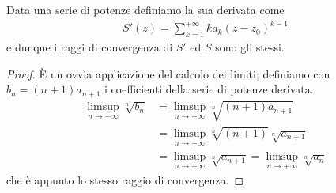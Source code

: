 \begin{theorem}
	\label{prop:invarianza-raggio-convergenza-derivata}
	Data una serie di potenze definiamo la sua derivata come 
	\begin{equation}
	\begin{aligned}
		S'(z) = \sum^{+\infty}_{k=1} ka_k(z-z_0)^{k-1}
	\end{aligned}
	\end{equation} 
	e dunque i raggi di convergenza di $S'$ ed $S$ sono gli stessi.
\end{theorem}
\begin{proof}
	È un ovvia applicazione del calcolo dei limiti; definiamo con $b_n = (n+1)a_{n+1}$ i coefficienti della serie di potenze derivata. 
	\begin{equation*}
	\begin{aligned}
		\limsup_{n\to+\infty} \sqrt[n]{b_n} & = \limsup_{n\to+\infty} \sqrt[n]{(n+1)a_{n+1}} \\
											& = \limsup_{n\to+\infty} \sqrt[n]{(n+1)} \sqrt[n]{a_{n+1}} \\
											& = \limsup_{n\to+\infty} \sqrt[n]{a_{n+1}} = \limsup_{n\to+\infty} \sqrt[n]{a_{n}} 
	\end{aligned}
	\end{equation*}
	che è appunto lo stesso raggio di convergenza.
\end{proof}

